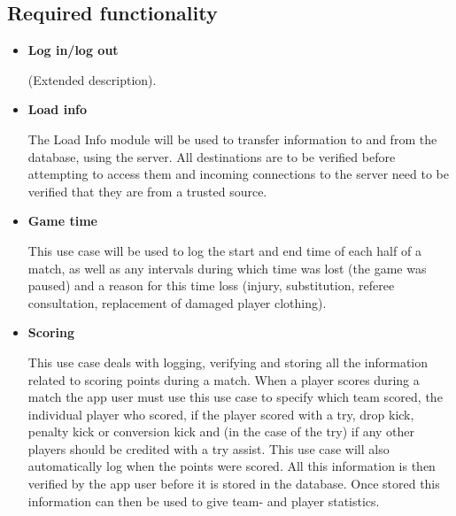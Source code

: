 \documentclass[a4paper,12pt]{report}
\begin{document}
\subsection{Required functionality}
\begin{itemize}
	\item \textbf{Log in/log out}
		\begin{flushleft}
		 (Extended description).	
		\end{flushleft}
		\begin{center}
		\end{center}
\newpage
\item \textbf{Load info}
		\begin{flushleft}
			The Load Info module will be used to transfer information to and from the database, using the server. All destinations are to be verified before attempting to access them and incoming connections to the server need to be verified that they are from a trusted source.
		\end{flushleft}
		\begin{center}
		\end{center}
\item  \textbf{Game time}
		\begin{flushleft}
		 This use case will be used to log the start and end time of each half of a match, as well as any intervals during which time was lost (the game was paused) and a reason for this time loss (injury, substitution, referee consultation, replacement of damaged player clothing).	
		\end{flushleft}
		\begin{center}
		\end{center}
\item \textbf{Scoring}
		\begin{flushleft}
		 This use case deals with logging, verifying and storing all the information related to scoring points during a match. When a player scores during a match the app user must use this use case to specify which team scored, the individual player who scored, if the player scored with a try, drop kick, penalty kick or conversion  kick and (in the case of the try) if any other players should be credited with a try assist. This use case will also automatically log when the points were scored. All this information is then verified by the app user before it is stored in the database. Once stored this information can then be used to give team- and player statistics.	

\end{flushleft}
\end{itemize}
\end{document}
